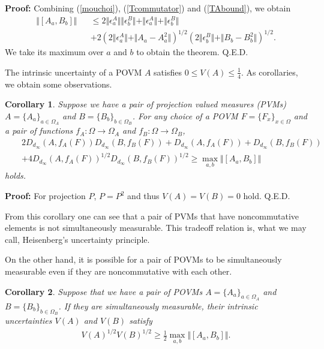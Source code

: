 \documentclass[12pt,showpacs,preprintnumbers,amsmath,amssymb]{revtex4-2}
\newtheorem{corollary}{Corollary}
\begin{document}
{\bf Proof:}
Combining (\ref{mouchoi}), (\ref{Tcommutator}) and 
(\ref{TAbound}), we obtain
\begin{eqnarray}
\Vert [A_a,B_b]
\Vert &&
\leq 2\Vert \epsilon^A_a \Vert \Vert \epsilon^B_b \Vert 
+\Vert \epsilon^A_a \Vert +\Vert \epsilon^B_b \Vert 
\nonumber
\\
&&
+2(2\Vert \epsilon^A_a\Vert +\Vert A_a-A_a^2\Vert
)^{1/2}
(2\Vert \epsilon^B_b\Vert +\Vert B_b-B_b^2\Vert
)^{1/2}.
\label{proof}
\end{eqnarray}
 We take its maximum over  
$a$ and $b$ to obtain the theorem.
\hfill Q.E.D. 
\par
The intrinsic uncertainty of a POVM $A$ satisfies 
$0\leq V(A)\leq \frac{1}{4}$. 
As corollaries, we obtain some observations.
\begin{corollary}\label{forPVM}
Suppose we have a pair of projection valued measures (PVMs) 
$A=\{A_a\}_{a\in \Omega_A}$ and $B=\{B_b\}_{b \in \Omega_B}$. 
For any choice of a POVM 
$F=\{F_x\}_{x\in \Omega}$ and a pair of functions 
$f_A: \Omega \to \Omega_A$ and $f_B: \Omega \to \Omega_B$, 
\begin{eqnarray*}
&&2 D_{d_{\infty}}(A, f_A(F))D_{d_{\infty}}(B, f_B(F))
+D_{d_{\infty}}(A,f_A(F))+D_{d_{\infty}}(B,f_B(F))
\\
&&
+4 D_{d_{\infty}}(A,f_A(F))^{1/2}D_{d_{\infty}}(B,f_B(F))^{1/2}
\geq \max_{a,b}\Vert[A_a,B_b]\Vert
\end{eqnarray*}
holds.
\end{corollary}
{\bf Proof:}
For projection $P$, $P =P^2$ and thus $V(A)=V(B)=0$ hold.
\hfill Q.E.D.
\par
From this corollary one can see that 
a pair of PVMs that have noncommutative elements 
is not simultaneously measurable. 
This tradeoff relation is, what we may call, 
Heisenberg's uncertainty principle. 
\par
On the other hand, it is possible for a pair of POVMs 
to be simultaneously measurable even if they are 
noncommutative with each other. 
\begin{corollary}
Suppose that we have a pair of POVMs $A=\{A_a\}_{a\in \Omega_A}$ 
and $B=\{B_b\}_{b\in \Omega_B}$. 
If they are simultaneously measurable, their 
intrinsic uncertainties $V(A)$ and $V(B)$ satisfy
\begin{eqnarray*}
V(A)^{1/2}V(B)^{1/2}\geq \frac{1}{2} \max_{a,b}\Vert [A_a, B_b]\Vert.
\end{eqnarray*}
\end{corollary}
\end{document}
